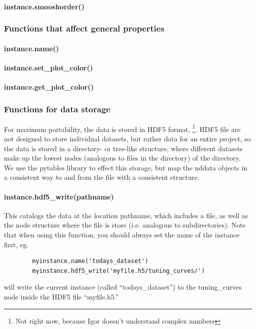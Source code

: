 \paragraph{instance.smooshorder()}
\subsubsection{Functions that affect general properties}
\paragraph{instance.name()}
\paragraph{instance.set\_plot\_color()}
\paragraph{instance.get\_plot\_color()}
\subsubsection{Functions for data storage}
For maximum portability, the data is stored in HDF5 format, \footnote{Not right now, because Igor doesn't understand complex numbers}.
HDF5 file are not designed to store individual datasets, but rather data for an entire project, so the data is stored in a directory- or tree-like structure, where different datasets make up the lowest nodes (analogous to files in the directory) of the directory. 
We use the pytables library to effect this storage, but map the nddata objects in a consistent way to and from the file with a consistent structure.
\paragraph{instance.hdf5_write(pathname)}
This catalogs the data at the location pathname,
    which includes a file, as well as the node structure
    where the file is store
    (i.e. analogous to subdirectories).
Note that when using this function,
    you should always set the name of the instance first, eg.
    \begin{lstlisting}
        myinstance.name('todays_dataset')
        myinstance.hdf5_write('myfile.h5/tuning_curves/')
    \end{lstlisting}
    will write the current instance (called ``todays\_dataset'') to
    the tuning\_curves node inside the HDF5 file ``myfile.h5.''
